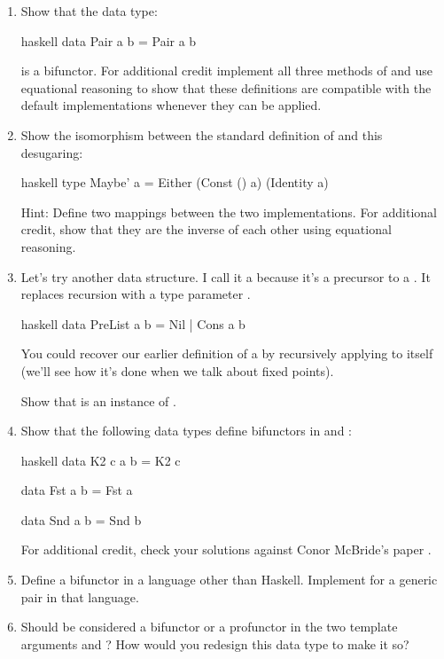 \begin{enumerate}
\tightlist
\item
  Show that the data type:

\begin{snip}{haskell}
data Pair a b = Pair a b
\end{snip}

  is a bifunctor. For additional credit implement all three methods of
   and use equational reasoning to show that these
  definitions are compatible with the default implementations whenever
  they can be applied.
\item
  Show the isomorphism between the standard definition of 
  and this desugaring:

\begin{snip}{haskell}
type Maybe' a = Either (Const () a) (Identity a)
\end{snip}

  Hint: Define two mappings between the two implementations. For
  additional credit, show that they are the inverse of each other using
  equational reasoning.
\item
  Let's try another data structure. I call it a  because
  it's a precursor to a . It replaces recursion with a type
  parameter .

\begin{snip}{haskell}
data PreList a b = Nil | Cons a b
\end{snip}

  You could recover our earlier definition of a  by
  recursively applying  to itself (we'll see how it's
  done when we talk about fixed points).

  Show that  is an instance of .
\item
  Show that the following data types define bifunctors in  and
  :

\begin{snip}{haskell}
data K2 c a b = K2 c

data Fst a b = Fst a

data Snd a b = Snd b
\end{snip}

  For additional credit, check your solutions against Conor McBride's
  paper .
\item
  Define a bifunctor in a language other than Haskell. Implement
   for a generic pair in that language.
\item
  Should  be considered a bifunctor or a profunctor in
  the two template arguments  and ? How would you
  redesign this data type to make it so?
\end{enumerate}
